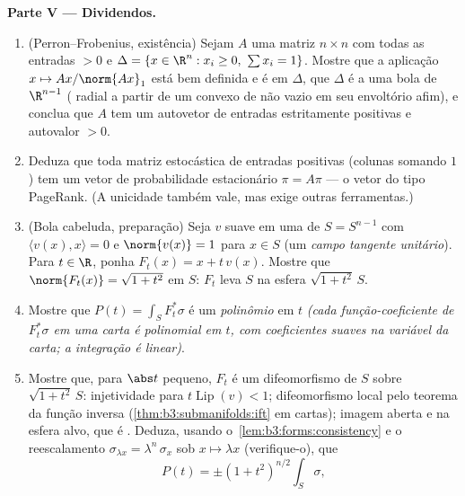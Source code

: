 \begin{problem}
\medskip
\noindent\textbf{Parte V --- Dividendos.}
\begin{enumerate}[resume]
  \item (Perron--Frobenius, existência) Sejam $A$ uma matriz $n\times n$
        com todas as entradas $> 0$ e $\Delta = \{x \in \R^n : x_i \geq 0,\ \sum x_i =
        1\}$. Mostre que a aplicação
        $x \mapsto Ax/\norm{Ax}_1$ está bem definida e é  em $\Delta$, que
        $\Delta$ é  a uma bola  de $\R^{n-1}$
        ( radial a partir de um  convexo de
         não vazio em seu envoltório afim), e conclua que
        $A$ tem um autovetor de entradas estritamente positivas e
        autovalor $> 0$.
  \item Deduza que toda matriz estocástica de entradas positivas
        (colunas somando $1$) tem um vetor de probabilidade
        estacionário $\pi = A\pi$ --- o vetor do tipo PageRank. (A unicidade
        também vale, mas exige outras ferramentas.)
  \item (Bola cabeluda, preparação) Seja $v$ suave em uma 
        de $S = S^{n-1}$ com $\langle v(x),
        x\rangle = 0$ e $\norm{v(x)} = 1$ para $x \in S$ (um \emph{campo tangente
        unitário}). Para $t \in \R$, ponha $F_t(x) = x + t\,v(x)$. Mostre que $\norm{F_t(x)} = \sqrt{1 + t^2}$ em $S$:
        $F_t$ leva $S$ na esfera $\sqrt{1+t^2}\,S$.
  \item Mostre que $P(t) = \int_SF_t^*\sigma$ é um \emph{polinômio} em $t$ \emph{(cada
        função-coeficiente de $F_t^*\sigma$ em uma carta é polinomial em $t$,
        com coeficientes suaves na variável da carta; a integração é
        linear)}.
  \item Mostre que, para $\abs t$ pequeno, $F_t$ é um
        difeomorfismo de $S$ sobre $\sqrt{1+t^2}\,S$: injetividade para $t\operatorname{Lip}(v) < 1$;
        difeomorfismo local pelo teorema da função inversa
        (\cref{thm:b3:submanifolds:ift} em cartas); imagem aberta e  na esfera
        alvo, que é . Deduza, usando o~\cref{lem:b3:forms:consistency} e o
        reescalamento $\sigma_{\lambda x} =
        \lambda^{n}\,\sigma_x$ sob $x \mapsto \lambda x$ (verifique-o), que
        \[
        P(t) = \pm(1 + t^2)^{n/2}\int_S\sigma,
\]
\end{enumerate}
\end{problem}
